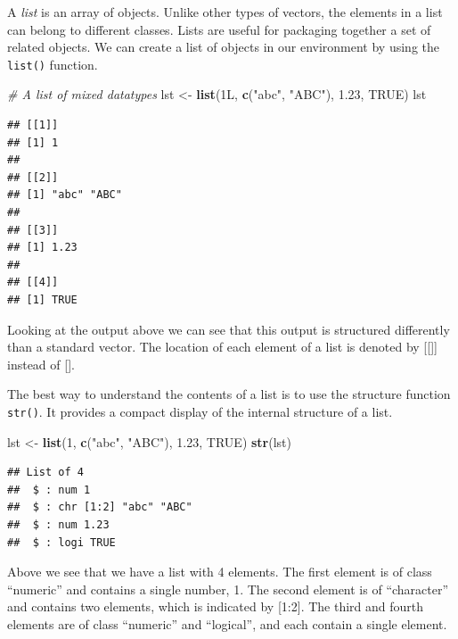 \documentclass[
]{book}
\newenvironment{Shaded}{\begin{snugshade}}{\end{snugshade}}
\newcommand{\CommentTok}[1]{\textcolor[rgb]{0.56,0.35,0.01}{\textit{#1}}}
\newcommand{\DecValTok}[1]{\textcolor[rgb]{0.00,0.00,0.81}{#1}}
\newcommand{\FloatTok}[1]{\textcolor[rgb]{0.00,0.00,0.81}{#1}}
\newcommand{\KeywordTok}[1]{\textcolor[rgb]{0.13,0.29,0.53}{\textbf{#1}}}
\newcommand{\NormalTok}[1]{#1}
\newcommand{\OtherTok}[1]{\textcolor[rgb]{0.56,0.35,0.01}{#1}}
\newcommand{\StringTok}[1]{\textcolor[rgb]{0.31,0.60,0.02}{#1}}
\begin{document}
A \emph{list} is an array of objects. Unlike other types of vectors, the elements in a list can belong to different classes. Lists are useful for packaging together a set of related objects. We can create a list of objects in our environment by using the \texttt{list()} function.

\begin{Shaded}
\begin{Highlighting}[]
\CommentTok{# A list of mixed datatypes}
\NormalTok{lst <-}\StringTok{ }\KeywordTok{list}\NormalTok{(1L, }\KeywordTok{c}\NormalTok{(}\StringTok{"abc"}\NormalTok{, }\StringTok{"ABC"}\NormalTok{), }\FloatTok{1.23}\NormalTok{, }\OtherTok{TRUE}\NormalTok{)}
\NormalTok{lst}
\end{Highlighting}
\end{Shaded}

\begin{verbatim}
## [[1]]
## [1] 1
## 
## [[2]]
## [1] "abc" "ABC"
## 
## [[3]]
## [1] 1.23
## 
## [[4]]
## [1] TRUE
\end{verbatim}

Looking at the output above we can see that this output is structured differently than a standard vector. The location of each element of a list is denoted by {[}{[}{]}{]} instead of {[}{]}.

The best way to understand the contents of a list is to use the structure function \texttt{str()}. It provides a compact display of the internal structure of a list.

\begin{Shaded}
\begin{Highlighting}[]
\NormalTok{lst <-}\StringTok{ }\KeywordTok{list}\NormalTok{(}\DecValTok{1}\NormalTok{, }\KeywordTok{c}\NormalTok{(}\StringTok{"abc"}\NormalTok{, }\StringTok{"ABC"}\NormalTok{), }\FloatTok{1.23}\NormalTok{, }\OtherTok{TRUE}\NormalTok{)}
\KeywordTok{str}\NormalTok{(lst)}
\end{Highlighting}
\end{Shaded}

\begin{verbatim}
## List of 4
##  $ : num 1
##  $ : chr [1:2] "abc" "ABC"
##  $ : num 1.23
##  $ : logi TRUE
\end{verbatim}

Above we see that we have a list with 4 elements. The first element is of class ``numeric'' and contains a single number, 1. The second element is of ``character'' and contains two elements, which is indicated by {[}1:2{]}. The third and fourth elements are of class ``numeric'' and ``logical'', and each contain a single element.
\end{document}
